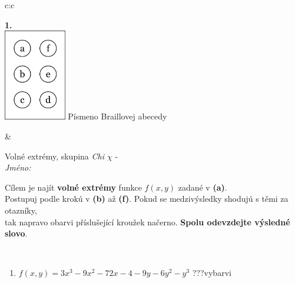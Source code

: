 \documentclass[10pt]{report}
\begin{document}
\begin{tabular}{c:c}
\begin{minipage}[c][104.5mm][t]{0.5\linewidth}
\begin{center}
\begin{minipage}{0.79\linewidth}
\begin{center}
\begin{varwidth}{\linewidth}
\begin{enumerate}
\end{enumerate}
\end{varwidth}
\end{center}
\end{minipage}
\begin{minipage}{0.20\linewidth}
\begin{center}
{\Huge\bfseries 1.} \\[2mm]
\includegraphics[height=40mm]{../images/braille.png}
{\small Písmeno Braillovej abecedy}
\end{center}
\end{minipage}
\end{center}
\end{minipage}
&
\begin{minipage}[c][104.5mm][t]{0.5\linewidth}
\begin{center}
\vspace{7mm}
{\huge Volné extrémy, skupina \textit{Chi $\chi$} -}\\[5mm]
\textit{Jméno:}\phantom{xxxxxxxxxxxxxxxxxxxxxxxxxxxxxxxxxxxxxxxxxxxxxxxxxxxxxxxxxxxxxxxxx}\\[5mm]
\begin{minipage}{0.95\linewidth}
\begin{center}
Cílem je najít \textbf{volné extrémy} funkce $f(x,y)$ zadané v \textbf{(a)}.\\Postupuj podle krokú v \textbf{(b)} až \textbf{(f)}. Pokud se medzivýsledky shodujú s těmi za otazníky,\\tak napravo obarvi příslušející kroužek načerno. \textbf{Spolu odevzdejte výsledné slovo}.
\end{center}
\end{minipage}
\\[1mm]
\begin{minipage}{0.79\linewidth}
\begin{center}
\begin{varwidth}{\linewidth}
\begin{enumerate}
\normalsize
\item $f(x,y)=3x^3-9x^2-72x-4-9y-6y^2-y^3$\quad \dotfill\; ???\;\dotfill \quad vybarvi

\end{enumerate}
\end{varwidth}
\end{center}
\end{minipage}
\end{center}
\end{minipage}
\end{tabular}
\end{document}
